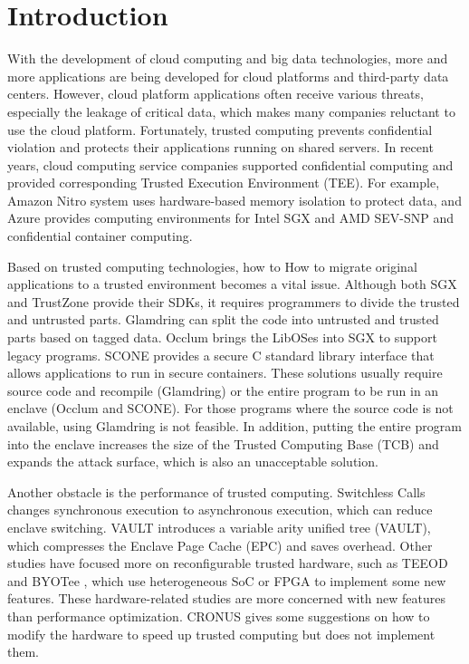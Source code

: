 \section{Introduction}
With the development of cloud computing and big data technologies,
more and more applications are being developed for cloud platforms
and third-party data centers. However, cloud platform applications
often receive various threats, especially the leakage of critical data,
which makes many companies reluctant to use the cloud platform.
Fortunately, trusted computing prevents confidential violation and
protects their applications running on shared servers.
In recent years, cloud computing service companies supported confidential
computing and provided corresponding Trusted Execution Environment (TEE).
For example, Amazon Nitro system \cite{AmazonNitro} uses hardware-based memory
isolation to protect data, and Azure \cite{AzureDocs} provides computing environments
for Intel SGX and AMD SEV-SNP and confidential container computing.

Based on trusted computing technologies, how to How to migrate original applications
to a trusted environment becomes a vital issue.
Although both SGX and TrustZone provide their SDKs,
it requires programmers to divide the trusted and untrusted parts.
Glamdring \cite{Lind2017GlamdringAA} can split the code into untrusted and
trusted parts based on tagged data. Occlum \cite{Shen2020OcclumSA} brings
the LibOSes into SGX to support legacy programs. SCONE \cite{Arnautov2016SCONESL}
provides a secure C standard library interface that allows applications to
run in secure containers.
These solutions usually require source code and recompile (Glamdring) or
the entire program to be run in an enclave (Occlum and SCONE).
For those programs where the source code is not available,
using Glamdring is not feasible.
In addition, putting the entire program into the enclave increases
the size of the Trusted Computing Base (TCB) and expands the attack surface,
which is also an unacceptable solution.

Another obstacle is the performance of trusted computing.
Switchless Calls \cite{Tian2018SwitchlessCM} changes synchronous execution
to asynchronous execution, which can reduce enclave switching.
VAULT \cite{Taassori2018VAULTRP} introduces a variable arity unified tree (VAULT),
which compresses the Enclave Page Cache (EPC) and saves overhead.
Other studies have focused more on reconfigurable trusted hardware,
such as TEEOD \cite{Pereira2021TowardsAT} and BYOTee \cite{Armanuzzaman2022BYOTeeTB},
which use heterogeneous SoC or FPGA to implement some new features.
These hardware-related studies are more concerned with new features than
performance optimization. CRONUS \cite{Jiang2022CRONUSFS} gives some suggestions
on how to modify the hardware to speed up trusted computing but does not
implement them.

